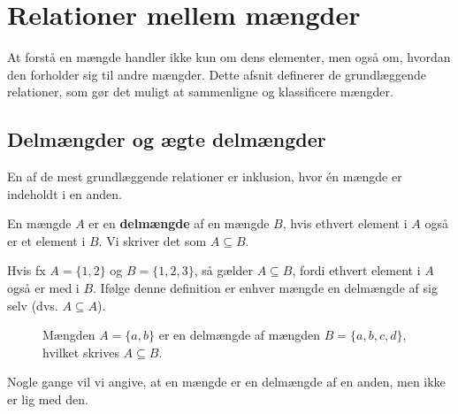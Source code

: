 \section{Relationer mellem mængder}
At forstå en mængde handler ikke kun om dens elementer, men også om, hvordan den forholder sig til andre mængder. Dette afsnit definerer de grundlæggende relationer, som gør det muligt at sammenligne og klassificere mængder.

\subsection*{Delmængder og ægte delmængder}
En af de mest grundlæggende relationer er inklusion, hvor én mængde er indeholdt i en anden.

\begin{definition}[Delmængde]
    En mængde $A$ er en \textbf{delmængde} af en mængde $B$, hvis ethvert element i $A$ også er et element i $B$. Vi skriver det som $A \subseteq B$.
\end{definition}

Hvis fx $A = \{1, 2\}$ og $B = \{1, 2, 3\}$, så gælder $A \subseteq B$, fordi ethvert element i $A$ også er med i $B$. Ifølge denne definition er enhver mængde en delmængde af sig selv (dvs. $A \subseteq A$).

\begin{figure}[htbp]
    \centering
    \caption{Mængden $A = \{a, b\}$ er en delmængde af mængden $B = \{a, b, c, d\}$, hvilket skrives $A \subseteq B$.}
    \label{fig:subset}
\end{figure}

Nogle gange vil vi angive, at en mængde er en delmængde af en anden, men ikke er lig med den.

